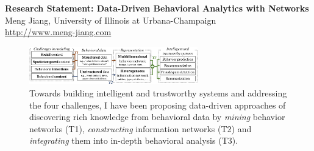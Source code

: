 \documentclass[10.5pt]{article}
\begin{document}


\begin{center}
{\Large \bf Research Statement: Data-Driven Behavioral Analytics with Networks} \\
\vskip 0.05in
{\large Meng Jiang, University of Illinois at Urbana-Champaign} \\
{\url{http://www.meng-jiang.com}}
\vskip -0.1in
\end{center}

\begin{figure}
\vskip -0.18in
\includegraphics[width=0.65\textwidth]{figure/intro.pdf}
\vskip -0.18in
\caption{Towards building intelligent and trustworthy systems and addressing the four challenges, I have been proposing data-driven approaches of discovering rich knowledge from behavioral data by \textit{mining} behavior networks (T1), \textit{constructing} information networks (T2) and \textit{integrating} them into in-depth behavioral analysis (T3).}
\label{fig:intro}
\vskip -0.12in
\end{figure}
\end{document}
